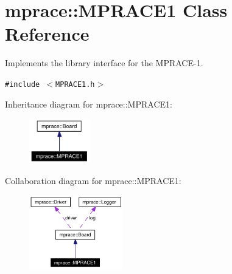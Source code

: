 \hypertarget{classmprace_1_1MPRACE1}{
\section{mprace::MPRACE1 Class Reference}
\label{classmprace_1_1MPRACE1}
}
Implements the library interface for the MPRACE-1.  


{\tt \#include $<$MPRACE1.h$>$}

Inheritance diagram for mprace::MPRACE1:\begin{figure}[H]
\begin{center}
\leavevmode
\includegraphics[width=74pt]{classmprace_1_1MPRACE1__inherit__graph}
\end{center}
\end{figure}
Collaboration diagram for mprace::MPRACE1:\begin{figure}[H]
\begin{center}
\leavevmode
\includegraphics[width=115pt]{classmprace_1_1MPRACE1__coll__graph}
\end{center}
\end{figure}
